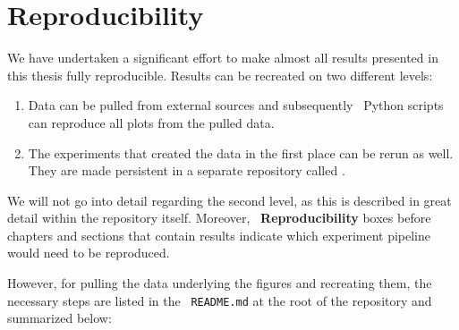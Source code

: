 \documentclass[\relativeRoot/main.tex]{subfiles}
\begin{document}
\section{Reproducibility}
\label{sec:intro:reproducibility}

We have undertaken a significant effort to make almost all results presented in this thesis fully reproducible. Results can be recreated on two different levels:

\begin{enumerate}[label={(\arabic*)}]
    \item Data can be pulled from external sources and subsequently ~Python scripts can reproduce all plots from the pulled data.
    \item The experiments that created the data in the first place can be rerun as well. They are made persistent in a separate repository called .
\end{enumerate}

We will not go into detail regarding the second level, as this is described in great detail within the  repository itself. Moreover, ~\textbf{Reproducibility} boxes before chapters and sections that contain results indicate which experiment pipeline would need to be reproduced.

However, for pulling the data underlying the figures and recreating them, the necessary steps are listed in the ~\texttt{README.md} at the root of the  repository and summarized below:
\end{document}
